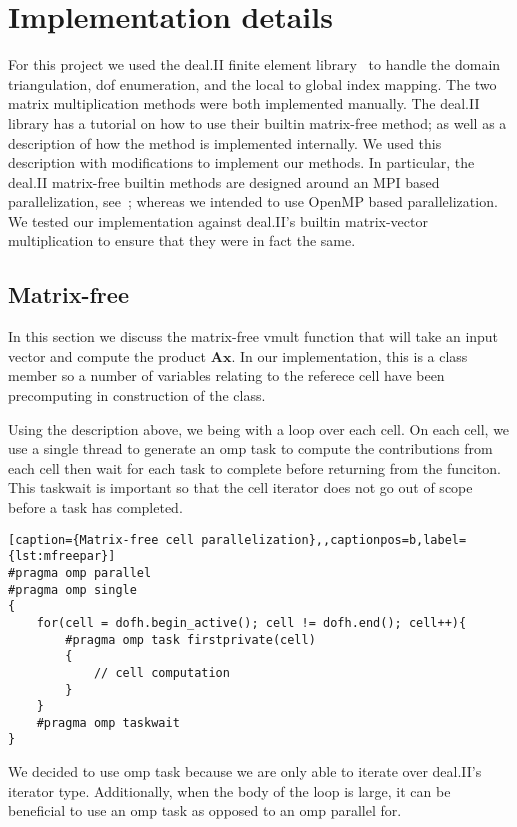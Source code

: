 \documentclass[12pt]{article}
\newcommand{\vect}[1]{\boldsymbol{\mathbf{#1}}}
\begin{document}
\section{Implementation details}

For this project we used the deal.II finite element library~\cite{dealII91} to handle the domain triangulation, dof enumeration, and the local to global index mapping. The two matrix multiplication methods were both implemented manually. The deal.II library has a tutorial on how to use their builtin matrix-free method; as well as a description of how the method is implemented internally. We used this description with modifications to implement our methods. In particular, the deal.II matrix-free builtin methods are designed around an MPI based parallelization, see~\cite{step37}; whereas we intended to use OpenMP based parallelization. We tested our implementation against deal.II's builtin matrix-vector multiplication to ensure that they were in fact the same.

\subsection{Matrix-free}
In this section we discuss the matrix-free vmult function that will take an input vector and compute the product $\vect A\vect x$. In our implementation, this is a class member so a number of variables relating to the referece cell have been precomputing in construction of the class.

Using the description above, we being with a loop over each cell. On each cell, we use a single thread to generate an omp task to compute the contributions from each cell then wait for each task to complete before returning from the funciton. This taskwait is important so that the cell iterator does not go out of scope before a task has completed. 
\begin{lstlisting}[caption={Matrix-free cell parallelization},,captionpos=b,label={lst:mfreepar}]
#pragma omp parallel
#pragma omp single
{
  	for(cell = dofh.begin_active(); cell != dofh.end(); cell++){
		#pragma omp task firstprivate(cell)
		{
			// cell computation
		}
	}
	#pragma omp taskwait
}            
\end{lstlisting}

We decided to use omp task because we are only able to iterate over deal.II's iterator type. Additionally, when the body of the loop is large, it can be beneficial to use an omp task as opposed to an omp parallel for. 
\end{document}
